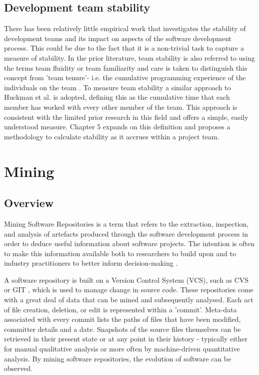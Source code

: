 \subsection{Development team stability}
There has been relatively little empirical work that investigates the stability of development teams and its impact on aspects of the software development process. This could be due to the fact that it is a non-trivial task to capture a measure of stability. In the prior literature, team stability is also referred to using the terms team fluidity or team familiarity \citep{huckman2009team} and care is taken to distinguish this concept from 'team tenure'- i.e. the cumulative programming experience of the individuals on the team \citep{hackman2002leading}. To measure team stability a similar approach to Huckman et al. \citep{huckman2009team} is adopted, defining this as the cumulative time that each member has worked with every other member of the team. This approach is consistent with the limited prior research in this field and offers a simple, easily understood measure. Chapter 5 expands on this definition and proposes a methodology to calculate stability as it accrues within a project team.
	
\section{Mining} %
\subsection{Overview}
Mining Software Repositories is a term that refers to the extraction, inspection, and analysis of artefacts produced through the software development process in order to deduce useful information about software projects. The intention is often to make this information available both to researchers to build upon and to industry practitioners to better inform decision-making \citep{hassan2008road}.

A software repository is built on a Version Control System (VCS), such as CVS \citep{cvs} or GIT \citep{git}, which is used to manage change in source code. These repositories come with a great deal of data that can be mined and subsequently analysed. Each act of file creation, deletion, or edit is represented within a 'commit'. Meta-data associated with every commit lists the paths of files that have been modified, committer details and a date. Snapshots of the source files themselves can be retrieved in their present state or at any point in their history - typically either for manual qualitative analysis or more often by machine-driven quantitative analysis. By mining software repositories, the evolution of software can be observed. 

